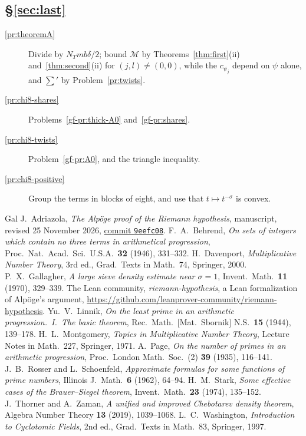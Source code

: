 \documentclass[reqno]{amsart}
\theoremstyle{definition}
\theoremstyle{plain}
\begin{document}
\subsection*{\S\ref{sec:last}}
\begin{description}
\item[\ref{pr:theoremA}] Divide by \(N_Tmb\delta/2\); bound \(\mathcal{M}\) by Theorems~\ref{thm:first}(ii) and~\ref{thm:second}(ii) for \((j,l) \ne (0,0)\), while the \(c_{\psi_j}\) depend on \(\psi\) alone, and \(\sum'\) by Problem~\ref{pr:twists}.
\item[\ref{pr:chi8-shares}] Problems~\ref{gf-pr:thick-A0} and~\ref{gf-pr:shares}.
\item[\ref{pr:chi8-twists}] Problem~\ref{gf-pr:A0}, and the triangle inequality.
\item[\ref{pr:chi8-positive}] Group the terms in blocks of eight, and use that \(t \mapsto t^{-\sigma}\) is convex.
\end{description}

\begin{thebibliography}{Gal}
 J.~Adriazola, \emph{The Alp\"oge proof of the Riemann hypothesis}, manuscript, revised 25 November 2026, \href{https://github.com/jimjamzola/RH-Alpoge-Reconstruction/tree/9eefc08b0819728d4dd2ef0568b49a61251af111}{commit \texttt{9eefc08}}.
 F.~A.~Behrend, \emph{On sets of integers which contain no three terms in arithmetical progression}, Proc.\ Nat.\ Acad.\ Sci.\ U.S.A.\ \textbf{32} (1946), 331--332.
 H.~Davenport, \emph{Multiplicative Number Theory}, 3rd ed., Grad.\ Texts in Math.\ 74, Springer, 2000.
 P.~X.~Gallagher, \emph{A large sieve density estimate near \(\sigma = 1\)}, Invent.\ Math.\ \textbf{11} (1970), 329--339.
 The Lean community, \emph{riemann-hypothesis}, a Lean formalization of Alp\"oge's argument, \url{https://github.com/leanprover-community/riemann-hypothesis}.
 Yu.~V.~Linnik, \emph{On the least prime in an arithmetic progression.~I.~The basic theorem}, Rec.\ Math.\ [Mat.\ Sbornik] N.S.\ \textbf{15} (1944), 139--178.
 H.~L.~Montgomery, \emph{Topics in Multiplicative Number Theory}, Lecture Notes in Math.\ 227, Springer, 1971.
 A.~Page, \emph{On the number of primes in an arithmetic progression}, Proc.\ London Math.\ Soc.\ (2) \textbf{39} (1935), 116--141.
 J.~B.~Rosser and L.~Schoenfeld, \emph{Approximate formulas for some functions of prime numbers}, Illinois J.\ Math.\ \textbf{6} (1962), 64--94.
 H.~M.~Stark, \emph{Some effective cases of the Brauer--Siegel theorem}, Invent.\ Math.\ \textbf{23} (1974), 135--152.
 J.~Thorner and A.~Zaman, \emph{A unified and improved Chebotarev density theorem}, Algebra Number Theory \textbf{13} (2019), 1039--1068.
 L.~C.~Washington, \emph{Introduction to Cyclotomic Fields}, 2nd ed., Grad.\ Texts in Math.\ 83, Springer, 1997.
\end{thebibliography}
\end{document}
